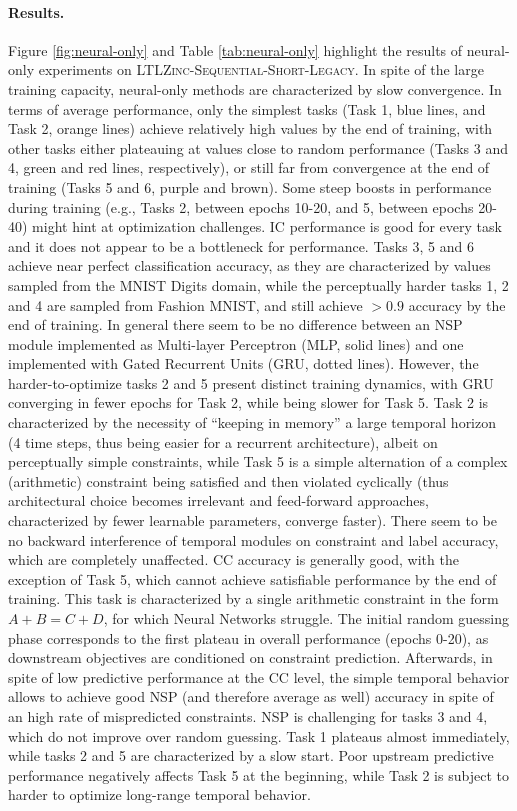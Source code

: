 \paragraph{Results.}
Figure \ref{fig:neural-only} and Table \ref{tab:neural-only} highlight the results of neural-only experiments on \textsc{LTLZinc-Sequential-Short-Legacy}.
In spite of the large training capacity, neural-only methods are characterized by slow convergence. In terms of average performance, only the simplest tasks (Task 1, blue lines, and Task 2, orange lines) achieve relatively high values by the end of training, with other tasks either plateauing at values close to random performance (Tasks 3 and 4, green and red lines, respectively), or still far from convergence at the end of training (Tasks 5 and 6, purple and brown). Some steep boosts in performance during training (e.g., Tasks 2, between epochs 10-20, and 5, between epochs 20-40) might hint at optimization challenges.
%
\textsc{IC} performance is good for every task and it does not appear to be a bottleneck for performance. Tasks 3, 5 and 6 achieve near perfect classification accuracy, as they are characterized by values sampled from the MNIST Digits domain, while the perceptually harder tasks 1, 2 and 4 are sampled from Fashion MNIST, and still achieve $>0.9$ accuracy by the end of training.
%
In general there seem to be no difference between an \textsc{NSP} module implemented as Multi-layer Perceptron (MLP, solid lines) and one implemented with Gated Recurrent Units (GRU, dotted lines). However, the harder-to-optimize tasks 2 and 5 present distinct training dynamics, with GRU converging in fewer epochs for Task 2, while being slower for Task 5. Task 2 is characterized by the necessity of ``keeping in memory'' a large temporal horizon (4 time steps, thus being easier for a recurrent architecture), albeit on perceptually simple constraints, while Task 5 is a simple alternation of a complex (arithmetic) constraint being satisfied and then violated cyclically (thus architectural choice becomes irrelevant and feed-forward approaches, characterized by fewer learnable parameters, converge faster). There seem to be no backward interference of temporal modules on constraint and label accuracy, which are completely unaffected.
%
\textsc{CC} accuracy is generally good, with the exception of Task 5, which cannot achieve satisfiable performance by the end of training. This task is characterized by a single arithmetic constraint in the form $A + B = C + D$, for which Neural Networks struggle. The initial random guessing phase corresponds to the first plateau in overall performance (epochs 0-20), as downstream objectives are conditioned on constraint prediction. Afterwards, in spite of low predictive performance at the \textsc{CC} level, the simple temporal behavior allows to achieve good \textsc{NSP} (and therefore average as well) accuracy in spite of an high rate of mispredicted constraints.
%
\textsc{NSP} is challenging for tasks 3 and 4, which do not improve over random guessing. Task 1 plateaus almost immediately, while tasks 2 and 5 are characterized by a slow start. Poor upstream predictive performance negatively affects Task 5 at the beginning, while Task 2 is subject to harder to optimize long-range temporal behavior.

